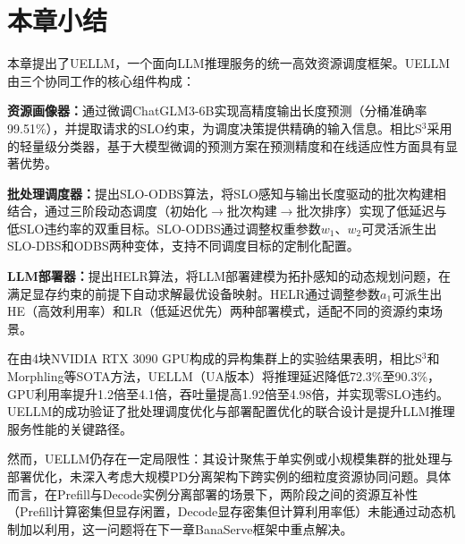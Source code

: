 \section{本章小结}
\label{sec:uellm_summary}

本章提出了UELLM，一个面向LLM推理服务的统一高效资源调度框架。UELLM由三个协同工作的核心组件构成：

\textbf{资源画像器：}通过微调ChatGLM3-6B实现高精度输出长度预测（分桶准确率99.51\%），并提取请求的SLO约束，为调度决策提供精确的输入信息。相比S$^3$采用的轻量级分类器，基于大模型微调的预测方案在预测精度和在线适应性方面具有显著优势。

\textbf{批处理调度器：}提出SLO-ODBS算法，将SLO感知与输出长度驱动的批次构建相结合，通过三阶段动态调度（初始化$\to$批次构建$\to$批次排序）实现了低延迟与低SLO违约率的双重目标。SLO-ODBS通过调整权重参数$w_1$、$w_2$可灵活派生出SLO-DBS和ODBS两种变体，支持不同调度目标的定制化配置。

\textbf{LLM部署器：}提出HELR算法，将LLM部署建模为拓扑感知的动态规划问题，在满足显存约束的前提下自动求解最优设备映射。HELR通过调整参数$a_1$可派生出HE（高效利用率）和LR（低延迟优先）两种部署模式，适配不同的资源约束场景。

在由4块NVIDIA RTX 3090 GPU构成的异构集群上的实验结果表明，相比S$^3$和Morphling等SOTA方法，UELLM（UA版本）将推理延迟降低72.3\%至90.3\%，GPU利用率提升1.2倍至4.1倍，吞吐量提高1.92倍至4.98倍，并实现零SLO违约。UELLM的成功验证了批处理调度优化与部署配置优化的联合设计是提升LLM推理服务性能的关键路径。

然而，UELLM仍存在一定局限性：其设计聚焦于单实例或小规模集群的批处理与部署优化，未深入考虑大规模PD分离架构下跨实例的细粒度资源协同问题。具体而言，在Prefill与Decode实例分离部署的场景下，两阶段之间的资源互补性（Prefill计算密集但显存闲置，Decode显存密集但计算利用率低）未能通过动态机制加以利用，这一问题将在下一章BanaServe框架中重点解决。



